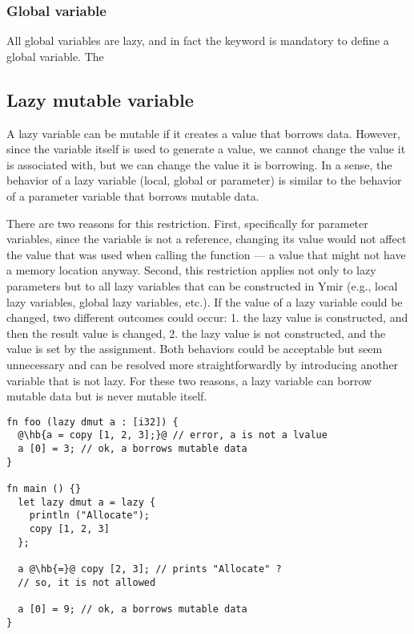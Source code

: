 \subsubsection*{Global variable}

All global variables are lazy, and in fact the keyword  is mandatory
to define a global variable. The

\subsection {Lazy mutable variable}
\label{sec:variable_lazy_mut}

A lazy variable can be mutable if it creates a value that borrows data. However,
since the variable itself is used to generate a value, we cannot change the
value it is associated with, but we can change the value it is borrowing. In a
sense, the behavior of a lazy variable (local, global or parameter) is similar
to the behavior of a parameter variable that borrows mutable data.

There are two reasons for this restriction. First, specifically for parameter
variables, since the variable is not a reference, changing its value would not
affect the value that was used when calling the function — a value that might
not have a memory location anyway. Second, this restriction applies not only to
lazy parameters but to all lazy variables that can be constructed in Ymir (e.g.,
local lazy variables, global lazy variables, etc.). If the value of a lazy
variable could be changed, two different outcomes could occur: 1. the lazy value
is constructed, and then the result value is changed, 2. the lazy value is not
constructed, and the value is set by the assignment. Both behaviors could be
acceptable but seem unnecessary and can be resolved more straightforwardly by
introducing another variable that is not lazy. For these two reasons, a lazy
variable can borrow mutable data but is never mutable itself.

\begin{lstlisting}[style=coloredverbatim, escapechar=@]
fn foo (lazy dmut a : [i32]) {
  @\hb{a = copy [1, 2, 3];}@ // error, a is not a lvalue
  a [0] = 3; // ok, a borrows mutable data
}

fn main () {}
  let lazy dmut a = lazy {
    println ("Allocate");
    copy [1, 2, 3]
  };

  a @\hb{=}@ copy [2, 3]; // prints "Allocate" ?
  // so, it is not allowed

  a [0] = 9; // ok, a borrows mutable data
}
\end{lstlisting}

